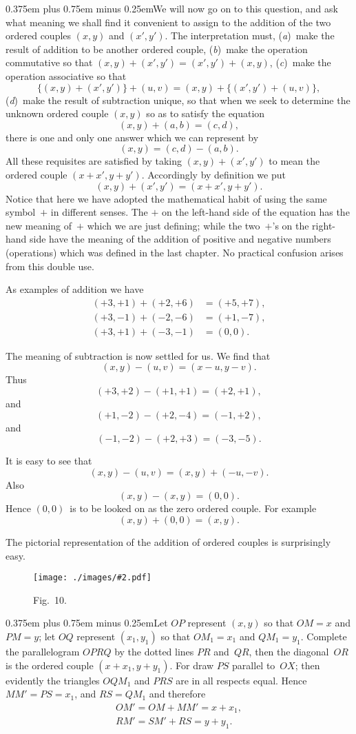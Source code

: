\documentclass[12pt,leqno]{book}[2005/09/16]
\newcommand{\Loosen}{\spaceskip 0.375em plus 0.75em minus 0.25em}
\newcommand{\Graphic}[2]{%
  \phantomsection\label{fig:#2}%
  \texttt{[image: ./images/\#2.pdf]}%
}
\newcommand{\DefWidth}{4in}%
\newcommand{\Figure}[2][\DefWidth]{%
  \begin{figure}[hbt!]
    \centering
    \phantomsection\label{fig:#2}
    \Graphic{#1}{fig#2}
    \caption{Fig.~#2.}
  \end{figure}\ignorespaces%
}
\newcommand{\PageSep}[1]{\ignorespaces}
\begin{document}
{\Loosen We will now go on to this question, and
ask what meaning we shall find it convenient
to assign to the addition of the two ordered
couples $(x, y)$ and $(x', y')$. The interpretation
must, (\textit{a})~make the result of addition
to be another ordered couple, (\textit{b})~make the
operation commutative so that $(x, y) + (x', y') = (x', y') + (x, y)$,
(\textit{c})~make the operation
associative so that}
\[
\{(x, y) + (x', y')\} + (u, v) = (x, y) + \{(x', y') + (u, v)\},
\]
(\textit{d})~make the result of subtraction unique,
so that when we seek to determine the
unknown ordered couple $(x, y)$ so as to
satisfy the equation
\[
(x, y) + (a, b) = (c, d),
\]
there is one and only one answer which we
can represent by
\[
(x, y) = (c, d) - (a, b).
\]
\PageSep{97}
All these requisites are satisfied by taking
$(x, y) + (x', y')$ to mean the ordered couple
$(x + x', y + y')$. Accordingly by definition we
put
\[
(x, y) + (x', y') = (x + x', y + y').
\]
Notice that here we have adopted the mathematical
habit of using the same symbol~$+$ in
different senses. The $+$ on the left-hand side
of the equation has the new meaning of~$+$
which we are just defining; while the two~$+$'s
on the right-hand side have the meaning
of the addition of positive and negative numbers
(operations) which was defined in the
last chapter. No practical confusion arises
from this double use.

As examples of addition we have
\begin{align*}
(+3, +1) + (+2, +6) &= (+5, +7), \\
(+3, -1) + (-2, -6) &= (+1, -7), \\
(+3, +1) + (-3, -1) &= (0, 0).
\end{align*}

The meaning of subtraction is now settled
for us. We find that
\[
(x, y) - (u, v) = (x - u, y - v).
\]
Thus
\[
(+3, +2) - (+1, +1) = (+2, +1),
\]
and
\[
(+1, -2) - (+2, -4) = (-1, +2),
\]
and
\[
(-1, -2) - (+2, +3) = (-3, -5).
\]
\PageSep{98}

It is easy to see that
\[
(x, y) - (u, v) = (x, y) + (-u, -v).
\]
Also
\[
(x, y) - (x, y) = (0, 0).
\]
Hence $(0, 0)$~is to be looked on as the zero
ordered couple. For example
\[
(x, y) + (0, 0) = (x, y).
\]

The pictorial representation of the addition
of ordered couples is surprisingly easy.
\Figure{10}

{\Loosen Let $OP$ represent $(x, y)$ so that $OM = x$
and $PM = y$; let $OQ$ represent $(x_{1}, y_{1})$ so that
$OM_{1} = x_{1}$ and $QM_{1} = y_{1}$. Complete the parallelogram
$OPRQ$ by the dotted lines $PR$ and~$QR$,
then the diagonal~$OR$ is the ordered
couple $(x + x_{1}, y + y_{1})$. For draw $PS$ parallel
\PageSep{99}
to~$OX$; then evidently the triangles $OQM_{1}$
and $PRS$ are in all respects equal. Hence
$MM' = PS = x_{1}$, and $RS = QM_{1}$ and therefore}
\begin{gather*}
OM' = OM + MM' = x + x_{1}, \\
RM' = SM' + RS = y + y_{1}.
\end{gather*}
\end{document}
